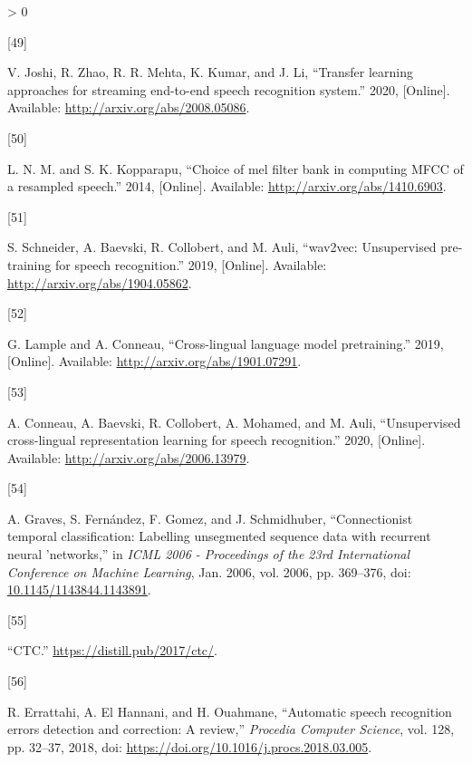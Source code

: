\documentclass[
  a4paper,
]{article}
\newlength{\cslhangindent}
\newlength{\csllabelwidth}
\newenvironment{CSLReferences}[2] %
 {%
  \setlength{\parindent}{0pt}
  \ifodd #1 \everypar{\setlength{\hangindent}{\cslhangindent}}\ignorespaces\fi
  \ifnum #2 > 0
  \setlength{\parskip}{#2\baselineskip}
  \fi
 }%
 {}
\newcommand{\CSLLeftMargin}[1]{\parbox[t]{\csllabelwidth}{#1}}
\newcommand{\CSLRightInline}[1]{\parbox[t]{\linewidth - \csllabelwidth}{#1}\break}
\begin{document}
\begin{CSLReferences}{0}{0}
\leavevmode\hypertarget{ref-joshi2020transfer}{}%
\CSLLeftMargin{{[}49{]} }
\CSLRightInline{V. Joshi, R. Zhao, R. R. Mehta, K. Kumar, and J. Li,
{``Transfer learning approaches for streaming end-to-end speech
recognition system.''} 2020, {[}Online{]}. Available:
\url{http://arxiv.org/abs/2008.05086}.}

\leavevmode\hypertarget{ref-m2014choice}{}%
\CSLLeftMargin{{[}50{]} }
\CSLRightInline{L. N. M. and S. K. Kopparapu, {``Choice of mel filter
bank in computing MFCC of a resampled speech.''} 2014, {[}Online{]}.
Available: \url{http://arxiv.org/abs/1410.6903}.}

\leavevmode\hypertarget{ref-schneider2019wav2vec}{}%
\CSLLeftMargin{{[}51{]} }
\CSLRightInline{S. Schneider, A. Baevski, R. Collobert, and M. Auli,
{``wav2vec: Unsupervised pre-training for speech recognition.''} 2019,
{[}Online{]}. Available: \url{http://arxiv.org/abs/1904.05862}.}

\leavevmode\hypertarget{ref-lample2019crosslingual}{}%
\CSLLeftMargin{{[}52{]} }
\CSLRightInline{G. Lample and A. Conneau, {``Cross-lingual language
model pretraining.''} 2019, {[}Online{]}. Available:
\url{http://arxiv.org/abs/1901.07291}.}

\leavevmode\hypertarget{ref-conneau2020unsupervised}{}%
\CSLLeftMargin{{[}53{]} }
\CSLRightInline{A. Conneau, A. Baevski, R. Collobert, A. Mohamed, and M.
Auli, {``Unsupervised cross-lingual representation learning for speech
recognition.''} 2020, {[}Online{]}. Available:
\url{http://arxiv.org/abs/2006.13979}.}

\leavevmode\hypertarget{ref-inproceedingsctc}{}%
\CSLLeftMargin{{[}54{]} }
\CSLRightInline{A. Graves, S. Fernández, F. Gomez, and J. Schmidhuber,
{``Connectionist temporal classification: Labelling unsegmented sequence
data with recurrent neural 'networks,''} in \emph{ICML 2006 -
Proceedings of the 23rd International Conference on Machine Learning},
Jan. 2006, vol. 2006, pp. 369--376, doi:
\href{https://doi.org/10.1145/1143844.1143891}{10.1145/1143844.1143891}.}

\leavevmode\hypertarget{ref-ctc}{}%
\CSLLeftMargin{{[}55{]} }
\CSLRightInline{{``CTC.''} \url{https://distill.pub/2017/ctc/}.}

\leavevmode\hypertarget{ref-ERRATTAHI201832}{}%
\CSLLeftMargin{{[}56{]} }
\CSLRightInline{R. Errattahi, A. El Hannani, and H. Ouahmane,
{``Automatic speech recognition errors detection and correction: A
review,''} \emph{Procedia Computer Science}, vol. 128, pp. 32--37, 2018,
doi: \url{https://doi.org/10.1016/j.procs.2018.03.005}.}


\end{CSLReferences}
\end{document}
